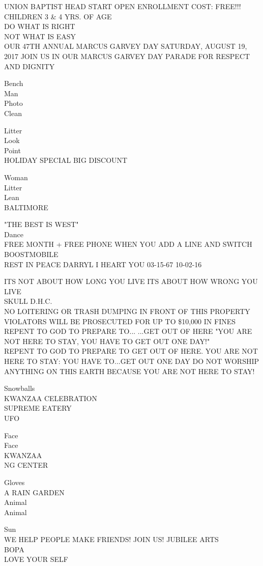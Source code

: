 \documentclass[10pt,letterpaper]{article}
\begin{document}
UNION BAPTIST HEAD START OPEN ENROLLMENT COST: FREE!!! CHILDREN 3 \& 4 YRS. OF AGE\\
DO WHAT IS RIGHT\\
NOT WHAT IS EASY\\
OUR 47TH ANNUAL MARCUS GARVEY DAY SATURDAY, AUGUST 19, 2017 JOIN US IN OUR MARCUS GARVEY DAY PARADE FOR RESPECT AND DIGNITY

Bench\\
Man\\
Photo\\
Clean

Litter\\
Look\\
Point\\
HOLIDAY SPECIAL BIG DISCOUNT

Woman\\
Litter\\
Lean\\
BALTIMORE

"THE BEST IS WEST"\\
Dance\\
FREE MONTH + FREE PHONE WHEN YOU ADD A LINE AND SWITCH BOOSTMOBILE\\
REST IN PEACE DARRYL I HEART YOU 03{-}15{-}67 10{-}02{-}16

ITS NOT ABOUT HOW LONG YOU LIVE ITS ABOUT HOW WRONG YOU LIVE\\
SKULL D.H.C.\\
NO LOITERING OR TRASH DUMPING IN FRONT OF THIS PROPERTY VIOLATORS WILL BE PROSECUTED FOR UP TO \$10,000 IN FINES REPENT TO GOD TO PREPARE TO... ...GET OUT OF HERE "YOU ARE NOT HERE TO STAY, YOU HAVE TO GET OUT ONE DAY!"\\
REPENT TO GOD TO PREPARE TO GET OUT OF HERE.  YOU ARE NOT HERE TO STAY: YOU HAVE TO...GET OUT ONE DAY DO NOT WORSHIP ANYTHING ON THIS EARTH BECAUSE YOU ARE NOT HERE TO STAY!

Snowballs\\
KWANZAA CELEBRATION\\
SUPREME EATERY\\
UFO

Face\\
Face\\
KWANZAA\\
NG CENTER

Gloves\\
A RAIN GARDEN\\
Animal\\
Animal

Sun\\
WE HELP PEOPLE MAKE FRIENDS!  JOIN US!  JUBILEE ARTS\\
BOPA\\
LOVE YOUR SELF
\end{document}
